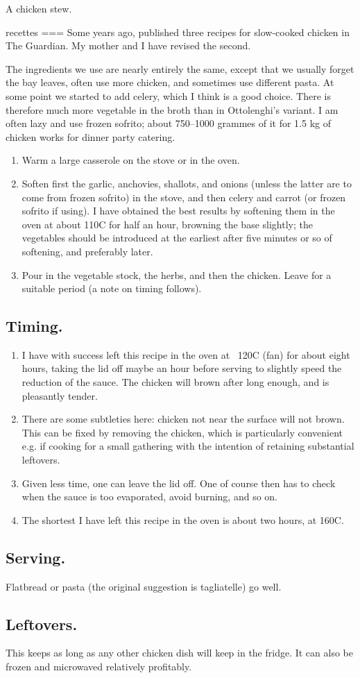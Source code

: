 A chicken stew.

recettes
===
Some years ago, \textcite{ottolenghi2017} published three recipes for slow-cooked chicken in The Guardian. My mother and I have revised the second.

The ingredients we use are nearly entirely the same, except that we usually forget the bay leaves, often use more chicken, and sometimes use different pasta. At some point we started to add celery, which I think is a good choice. There is therefore much more vegetable in the broth than in Ottolenghi’s variant. I am often lazy and use frozen sofrito; about 750–1000 grammes of it for 1.5 kg of chicken works for dinner party catering.
\begin{enumerate}
\item    Warm a large casserole on the stove or in the oven.
\item    Soften first the garlic, anchovies, shallots, and onions (unless the latter are to come from frozen sofrito) in the stove, and then celery and carrot (or frozen sofrito if using). I have obtained the best results by softening them in the oven at about 110C for half an hour, browning the base slightly; the vegetables should be introduced at the earliest after five minutes or so of softening, and preferably later.
\item    Pour in the vegetable stock, the herbs, and then the chicken. Leave for a suitable period (a note on timing follows).
\end{enumerate}

\subsection{Timing.}
\begin{enumerate}
    \item I have with success left this recipe in the oven at ~120C (fan) for about eight hours, taking the lid off maybe an hour before serving to slightly speed the reduction of the sauce. The chicken will brown after long enough, and is pleasantly tender.
    \item There are some subtleties here: chicken not near the surface will not brown. This can be fixed by removing the chicken, which is particularly convenient e.g. if cooking for a small gathering with the intention of retaining substantial leftovers.
    \item Given less time, one can leave the lid off. One of course then has to check when the sauce is too evaporated, avoid burning, and so on.
    \item The shortest I have left this recipe in the oven is about two hours, at 160C.
\end{enumerate}

\subsection{Serving.}
Flatbread or pasta (the original suggestion is tagliatelle) go well.

\subsection{Leftovers.}
This keeps as long as any other chicken dish will keep in the fridge. It can also be frozen and microwaved relatively profitably.
